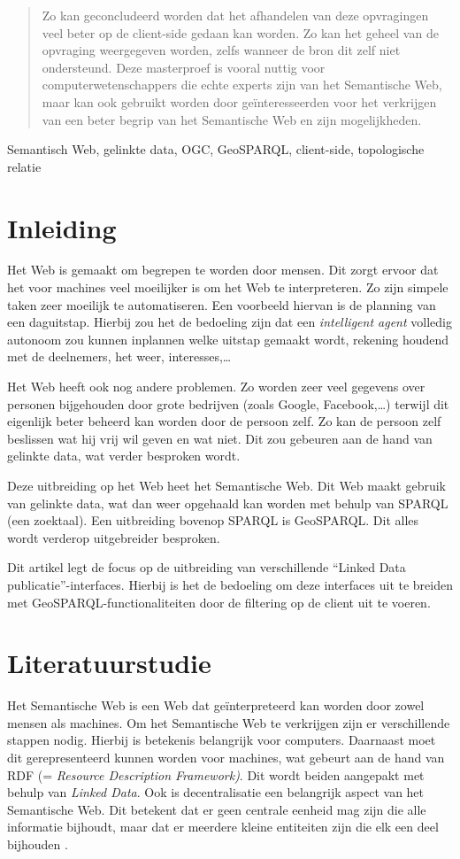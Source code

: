 \documentclass[twocolumn]{phdsymp} %
\begin{document}
\begin{abstract}
    Zo kan geconcludeerd worden dat het afhandelen van deze opvragingen veel beter op de client-side gedaan kan worden. Zo kan het geheel van de opvraging weergegeven worden, zelfs wanneer de bron dit zelf niet ondersteund. Deze masterproef is vooral nuttig voor computerwetenschappers die echte experts zijn van het Semantische Web, maar kan ook gebruikt worden door geïnteresseerden voor het verkrijgen van een beter begrip van het Semantische Web en zijn mogelijkheden.
\end{abstract}

\begin{keywords}
    Semantisch Web, gelinkte data, OGC, GeoSPARQL, client-side, topologische relatie
\end{keywords}

\section{Inleiding}
Het Web is gemaakt om begrepen te worden door mensen. Dit zorgt ervoor dat het voor machines veel moeilijker is om het Web te interpreteren. Zo zijn simpele taken zeer moeilijk te automatiseren. Een voorbeeld hiervan is de planning van een daguitstap. Hierbij zou het de bedoeling zijn dat een \textit{intelligent agent} volledig autonoom zou kunnen inplannen welke uitstap gemaakt wordt, rekening houdend met de deelnemers, het weer, interesses,\dots 

Het Web heeft ook nog andere problemen. Zo worden zeer veel gegevens over personen bijgehouden door grote bedrijven (zoals Google, Facebook,\dots) terwijl dit eigenlijk beter beheerd kan worden door de persoon zelf. Zo kan de persoon zelf beslissen wat hij vrij wil geven en wat niet. Dit zou gebeuren aan de hand van gelinkte data, wat verder besproken wordt.

Deze uitbreiding op het Web heet het Semantische Web. Dit Web maakt gebruik van gelinkte data, wat dan weer opgehaald kan worden met behulp van SPARQL (een zoektaal). Een uitbreiding bovenop SPARQL is GeoSPARQL. Dit alles wordt verderop uitgebreider besproken.

Dit artikel legt de focus op de uitbreiding van verschillende ``Linked Data publicatie''-interfaces. Hierbij is het de bedoeling om deze interfaces uit te breiden met GeoSPARQL-functionaliteiten door de filtering op de client uit te voeren.

\section{Literatuurstudie}
Het Semantische Web is een Web dat geïnterpreteerd kan worden door zowel mensen als machines. Om het Semantische Web te verkrijgen zijn er verschillende stappen nodig. Hierbij is betekenis belangrijk voor computers. Daarnaast moet dit gerepresenteerd kunnen worden voor machines, wat gebeurt aan de hand van RDF (= \textit{Resource Description Framework)}. Dit wordt beiden aangepakt met behulp van \textit{Linked Data}. Ook is decentralisatie een belangrijk aspect van het Semantische Web. Dit betekent dat er geen centrale eenheid mag zijn die alle informatie bijhoudt, maar dat er meerdere kleine entiteiten zijn die elk een deel bijhouden \cite{berners2001semantic}.
\end{document}
